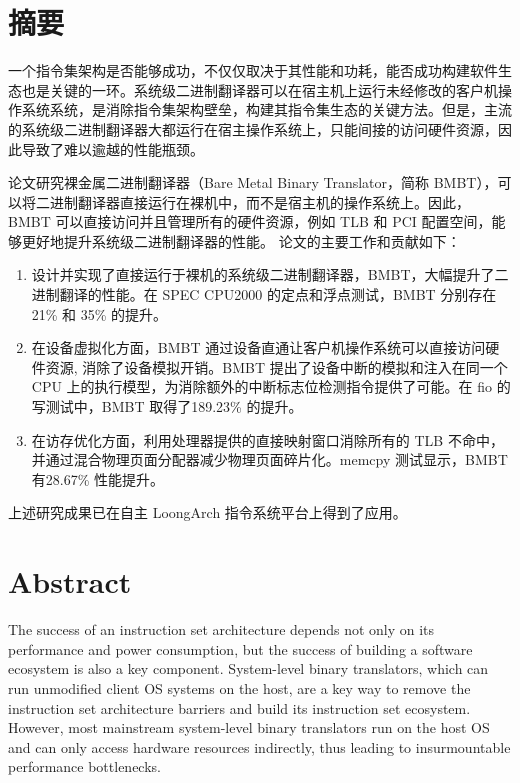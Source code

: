 \maketitle%
\MAKETITLE%
\makedeclaration%
\intobmk\chapter*{摘\quad 要}%
\setcounter{page}{1}%
一个指令集架构是否能够成功，不仅仅取决于其性能和功耗，能否成功构建软件生态也是关键的一环。系统级二进制翻译器可以在宿主机上运行未经修改的客户机操作系统系统，是消除指令集架构壁垒，构建其指令集生态的关键方法。但是，主流的系统级二进制翻译器大都运行在宿主操作系统上，只能间接的访问硬件资源，因此导致了难以逾越的性能瓶颈。

论文研究裸金属二进制翻译器（Bare Metal Binary Translator，简称 BMBT），可以将二进制翻译器直接运行在裸机中，而不是宿主机的操作系统上。因此，BMBT 可以直接访问并且管理所有的硬件资源，例如 TLB 和 PCI 配置空间，能够更好地提升系统级二进制翻译器的性能。
论文的主要工作和贡献如下：
\begin{enumerate}
	\item 设计并实现了直接运行于裸机的系统级二进制翻译器，BMBT，大幅提升了二进制翻译的性能。在 SPEC CPU2000 的定点和浮点测试，BMBT 分别存在 21\% 和 35\% 的提升。
	\item 在设备虚拟化方面，BMBT 通过设备直通让客户机操作系统可以直接访问硬件资源, 消除了设备模拟开销。BMBT 提出了设备中断的模拟和注入在同一个 CPU 上的执行模型，为消除额外的中断标志位检测指令提供了可能。在 fio 的写测试中，BMBT 取得了189.23\% 的提升。
	\item 在访存优化方面，利用处理器提供的直接映射窗口消除所有的 TLB 不命中，并通过混合物理页面分配器减少物理页面碎片化。memcpy 测试显示，BMBT 有28.67\% 性能提升。
\end{enumerate}

上述研究成果已在自主 LoongArch 指令系统平台上得到了应用。

\intobmk\chapter*{Abstract}%
The success of an instruction set architecture depends not only on its performance and power consumption, but the success of building a software ecosystem is also a key component. System-level binary translators, which can run unmodified client OS systems on the host, are a key way to remove the instruction set architecture barriers and build its instruction set ecosystem. However, most mainstream system-level binary translators run on the host OS and can only access hardware resources indirectly, thus leading to insurmountable performance bottlenecks.

